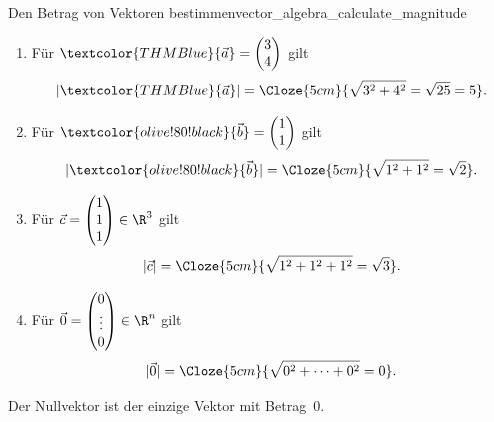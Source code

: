 \begin{ExampleBox}{Den Betrag von Vektoren bestimmen}{vector_algebra_calculate_magnitude}
  \begin{minipage}[c]{0.54\linewidth}
    \begin{enumerate}[label=\alph*),leftmargin=1.7em,itemsep=1em]
      \item Für $\textcolor{THMBlue}{\vec a}=\begin{pmatrix}3\\4\end{pmatrix}$ gilt
        \[
          |\textcolor{THMBlue}{\vec a}|
          =\Cloze{5cm}{\sqrt{3^2+4^2}=\sqrt{25}=5}.
        \]

      \item Für $\textcolor{olive!80!black}{\vec b}=\begin{pmatrix}1\\1\end{pmatrix}$ gilt
        \[
          |\textcolor{olive!80!black}{\vec b}|
          =\Cloze{5cm}{\sqrt{1^2+1^2}=\sqrt2}.
        \]

      \item Für $\vec c=\begin{pmatrix}1\\1\\1\end{pmatrix}\in\R^3$ gilt
        \[
          |\vec c|
          =\Cloze{5cm}{\sqrt{1^2+1^2+1^2}=\sqrt3}.
        \]

      \item Für $\vec 0=\begin{pmatrix}0\\\vdots\\0\end{pmatrix}\in\R^n$ gilt
        \[
          |\vec 0|
          =\Cloze{5cm}{\sqrt{0^2+\dots+0^2}=0}.
        \]
    \end{enumerate}
    Der Nullvektor ist der einzige Vektor mit Betrag~$0$.
  \end{minipage}\hfill
  \begin{minipage}[c]{0.42\linewidth}
    \centering
  \end{minipage}
\end{ExampleBox}

